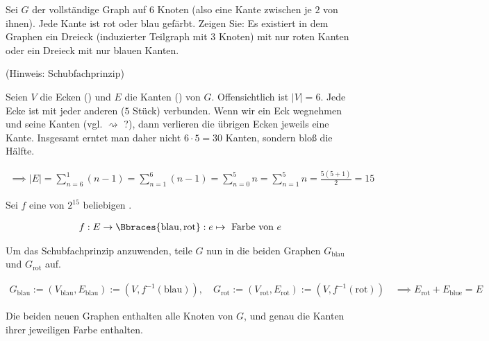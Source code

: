 
\begin{exercise}

Sei $G$ der vollständige Graph auf $6$ Knoten (also eine Kante zwischen je $2$ von ihnen).
Jede Kante ist rot oder blau gefärbt.
Zeigen Sie:
Es existiert in dem Graphen ein Dreieck (induzierter Teilgraph mit $3$ Knoten) mit nur roten Kanten oder ein Dreieck mit nur blauen Kanten.

(Hinweis: Schubfachprinzip)

\end{exercise}


\begin{solution}

Seien $V$ die Ecken () und $E$ die Kanten () von $G$.
Offensichtlich ist $|V| = 6$.
Jede Ecke ist mit jeder anderen ($5$ Stück) verbunden.
Wenn wir ein Eck wegnehmen und seine Kanten  (vgl.  $\rightsquigarrow$ ?), dann verlieren die übrigen Ecken jeweils eine Kante.
Insgesamt erntet man daher nicht $6 \cdot 5 = 30$ Kanten, sondern bloß die Hälfte.

\begin{align*}
  \implies
  |E|
  =
  \sum_{n=6}^1 (n - 1)
  =
  \sum_{n=1}^6 (n - 1)
  =
  \sum_{n=0}^5 n
  =
  \sum_{n=1}^5 n
  =
  \frac{5 (5 + 1)}{2}
  =
  15
\end{align*}

Sei $f$ eine von $2^{15}$ beliebigen .

\begin{align*}
  f:
  E \to \Bbraces{\text{blau}, \text{rot}}:
  e \mapsto ~\text{Farbe von}~ e
\end{align*}

Um das Schubfachprinzip anzuwenden, teile $G$ nun in die beiden Graphen $G_{\text{blau}}$ und $G_{\text{rot}}$ auf.

\begin{align*}
  G_{\text{blau}} := (V_{\text{blau}}, E_{\text{blau}}) := (V, f^{-1}(\text{blau})),
  \quad
  G_{\text{rot}}  := (V_{\text{rot}}, E_{\text{rot}})   :=(V, f^{-1}(\text{rot}))
  \quad
  \implies
  E_{\text{rot}} + E_{\text{blue}} = E
\end{align*}

Die beiden neuen Graphen enthalten alle Knoten von $G$, und genau die Kanten ihrer jeweiligen Farbe enthalten.


\end{solution}
